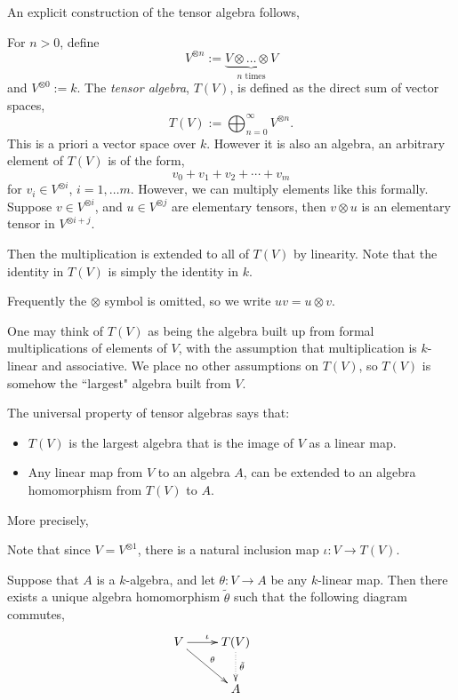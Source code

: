 \documentclass{owmaths}
\begin{document}
An explicit construction of the tensor algebra follows,
\begin{definition}
    For $n > 0$, define
    \begin{equation*}
        V^{\otimes n} := \underbrace{V \otimes \ldots \otimes V}_{n\text{ times}}
    \end{equation*}
    and $V^{\otimes 0} := k$. The \emph{tensor algebra}, $T(V)$, is defined as 
    the direct sum of vector spaces,
    \begin{equation*}
        T(V) := \bigoplus_{n=0}^\infty V^{\otimes n}.
    \end{equation*}
    This is a priori a vector space over $k$. However it is also an algebra, an
    arbitrary element of $T(V)$ is of the form,
    \begin{equation*}
        v_0+v_1+v_2+\cdots+v_m
    \end{equation*}
    for $v_i \in V^{\otimes i}$, $i = 1,\ldots m$. However, we can multiply 
    elements like this formally. Suppose $v \in V^{\otimes i}$, and $u \in V^{\otimes j}$
    are elementary tensors, then $v \otimes u$ is an elementary tensor in $V^{\otimes i+j}$.
    
    Then the multiplication is extended to all of $T(V)$ by linearity.
    Note that the identity in $T(V)$ is simply the identity in $k$.
    
    Frequently the $\otimes$ symbol is omitted, so we write $uv = u \otimes v$.
\end{definition}

One may think of $T(V)$ as being the algebra built up from
formal multiplications of elements of $V$, with the assumption
that multiplication is $k$-linear and associative. We place no other assumptions on $T(V)$,
so $T(V)$ is somehow the ``largest" algebra built from $V$.

The universal property of tensor algebras says that:
\begin{itemize}
    \item{} $T(V)$ is the largest algebra that is the image of $V$ as a linear map.
    \item{} Any linear map from $V$ to an algebra $A$, can be extended to an algebra homomorphism from $T(V)$ to $A$.
\end{itemize}

More precisely,
\begin{proposition}
    Note that since $V = V^{\otimes 1}$, there is a natural
    inclusion map $\iota: V \rightarrow T(V)$.
    
    Suppose that $A$ is a $k$-algebra, and let $\theta:V\rightarrow A$
    be any $k$-linear map. Then there exists a unique algebra homomorphism
    $\tilde{\theta}$ such that the following diagram commutes,
    \begin{displaymath}
    \xymatrix{
        V \ar[r]^\iota \ar[rd]^\theta &
        T(V) \ar@{.>}[d]^{\tilde{\theta}} &\\
        &
        A
    }
    \end{displaymath}
\end{proposition}
\end{document}
